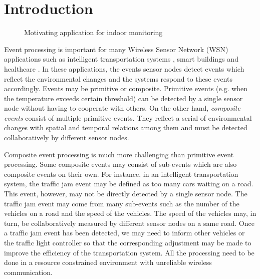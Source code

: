 \section{Introduction}
\label{sec:introduction}

\begin{figure}
\centering
{}
\caption{Motivating application for indoor monitoring}
\label{fig:rooms}
\end{figure}

Event processing is important for many Wireless Sensor Network (WSN) applications such as intelligent transportation systems \cite{klein:its}, smart buildings \cite{lynch:shm} and healthcare \cite{lo:ban}. In these applications, the events sensor nodes detect events which reflect the environmental changes and the systems respond to these events accordingly. Events may be primitive or composite. Primitive events (e.g. when the temperature exceeds certain threshold) can be detected by a single sensor node without having to cooperate with others. On the other hand, \emph{composite events} consist of multiple primitive events. They reflect a serial of environmental changes with spatial and temporal relations among them and must be detected collaboratively by different sensor nodes.

Composite event processing is much more challenging than primitive event processing. Some composite events may consist of sub-events which are also composite events on their own. For instance, in an intelligent transportation system, the traffic jam event may be defined as too many cars waiting on a road. This event, however, may not be directly detected by a single sensor node. The traffic jam event may come from many sub-events such as the number of the vehicles on a road and the speed of the vehicles. The speed of the vehicles may, in turn, be collaboratively measured by different sensor nodes on a same road. Once a traffic jam event has been detected, we may need to inform other vehicles or the traffic light controller so that the corresponding adjustment may be made to improve the efficiency of the transportation system. All the processing need to be done in a resource constrained environment with unreliable wireless communication.

